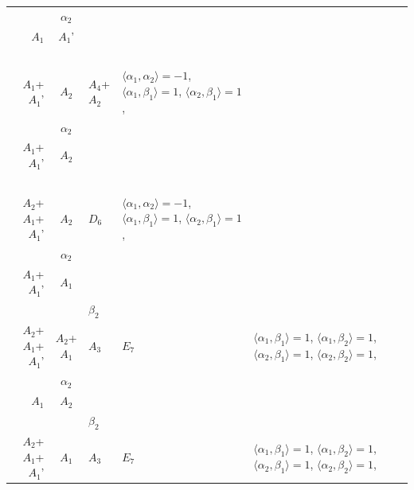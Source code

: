\documentclass[12pt]{report}
\begin{document}
\begin{appendix}
{\begin{longtable}{rcl p{1cm}p{1cm}p{3cm} }
\begin{tabular}{cc}$\alpha_1$+ & $\alpha_2$\\\tiny{ $A_1$ } & \tiny{ $A_1$' }\end{tabular} &\begin{tabular}{c} = \\~ \end{tabular} & \begin{tabular}{c}$\beta_1$\\\tiny{ $A_1$+$A_1$' }\end{tabular} & $A_2$ & $A_4$+$A_2$ & $\langle\alpha_1, \alpha_2\rangle=-1$,  $\langle\alpha_1, \beta_1\rangle=1$, $\langle\alpha_2, \beta_1\rangle=1$, 
\\
\begin{tabular}{cc}$\alpha_1$+ & $\alpha_2$\\\tiny{ $A_1$+$A_1$' } & \tiny{ $A_2$ }\end{tabular} &\begin{tabular}{c} = \\~ \end{tabular} & \begin{tabular}{c}$\beta_1$\\\tiny{ $A_2$+$A_1$+$A_1$' }\end{tabular} & $A_2$ & $D_6$ & $\langle\alpha_1, \alpha_2\rangle=-1$,  $\langle\alpha_1, \beta_1\rangle=1$, $\langle\alpha_2, \beta_1\rangle=1$, 
\\
\begin{tabular}{cc}$\alpha_1$+ & $\alpha_2$\\\tiny{ $A_1$+$A_1$' } & \tiny{ $A_1$ }\end{tabular} &\begin{tabular}{c} = \\~ \end{tabular} & \begin{tabular}{cc}$\beta_1$+ & $\beta_2$\\\tiny{ $A_2$+$A_1$+$A_1$' } & \tiny{ $A_2$+$A_1$ }\end{tabular} & $A_3$ & $E_7$ &  $\langle\alpha_1, \beta_1\rangle=1$, $\langle\alpha_1, \beta_2\rangle=1$, $\langle\alpha_2, \beta_1\rangle=1$, $\langle\alpha_2, \beta_2\rangle=1$, 
\\
\begin{tabular}{cc}$\alpha_1$+ & $\alpha_2$\\\tiny{ $A_1$ } & \tiny{ $A_2$ }\end{tabular} &\begin{tabular}{c} = \\~ \end{tabular} & \begin{tabular}{cc}$\beta_1$+ & $\beta_2$\\\tiny{ $A_2$+$A_1$+$A_1$' } & \tiny{ $A_1$ }\end{tabular} & $A_3$ & $E_7$ &  $\langle\alpha_1, \beta_1\rangle=1$, $\langle\alpha_1, \beta_2\rangle=1$, $\langle\alpha_2, \beta_1\rangle=1$, $\langle\alpha_2, \beta_2\rangle=1$, 

\end{longtable}}
\end{appendix}
\end{document}
